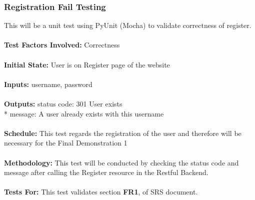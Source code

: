 \documentclass[12pt, titlepage]{article}
\begin{document}
\subsubsection{{Registration Fail Testing}}
This will be a unit test using PyUnit (Mocha) to validate correctness of register. \\
\\
\textbf{Test Factors Involved:} Correctness \\
\\
\textbf{Initial State: } User is on Register page of the website \\
\\
\textbf{Inputs: } username, password \\
\\
\textbf{Outputs:} status code: 301 User exists \\*
                  message: A user already exists with this username \\
\\
\textbf{Schedule:} This test regards the registration of the user and therefore will be necessary for the Final Demonstration 1 \\
\\
\textbf{Methodology: } This test will be conducted by checking the status code and message after calling the Register resource in the Restful Backend. \\
\\
\textbf{Tests For:} This test validates section \textbf{FR1}, of SRS document.

\end{document}
